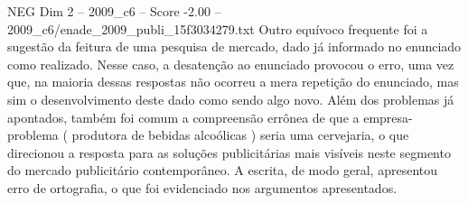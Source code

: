 \begin{textsample}{NEG Dim 2 – 2009\_c6 – Score -2.00 – 2009\_c6/enade\_2009\_publi\_15f3034279.txt}
Outro equívoco frequente foi a sugestão da feitura de uma pesquisa de mercado, dado já informado no enunciado como realizado.
Nesse caso, a desatenção ao enunciado provocou o erro, uma vez que, na maioria dessas respostas não ocorreu a mera repetição do enunciado, mas sim o desenvolvimento deste dado como sendo algo novo.
Além dos problemas já apontados, também foi comum a compreensão errônea de que a empresa-problema ( produtora de bebidas alcoólicas ) seria uma cervejaria, o que direcionou a resposta para as soluções publicitárias mais visíveis neste segmento do mercado publicitário contemporâneo.
A escrita, de modo geral, apresentou erro de ortografia, o que foi evidenciado nos argumentos apresentados.

\end{textsample}
